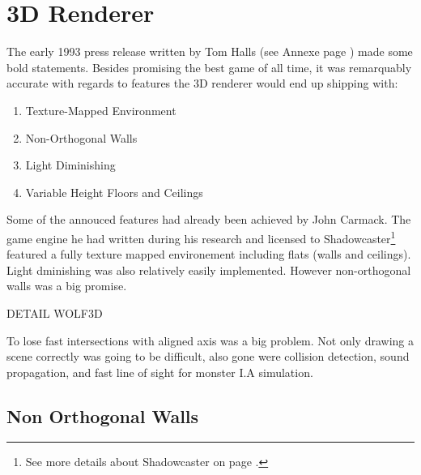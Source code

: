 \section{3D Renderer}
The early 1993 press release written by Tom Halls (see Annexe page \pageref{label_press_release}) made some bold statements. Besides promising the best game of all time, it was remarquably accurate with regards to features the 3D renderer would end up shipping with:\\
\par
\begin{enumerate}
\item Texture-Mapped Environment
\item Non-Orthogonal Walls
\item Light Diminishing
\item Variable Height Floors and Ceilings
\end{enumerate}
\par
Some of the annouced features had already been achieved by John Carmack. The game engine he had written during his research and licensed to Shadowcaster\footnote{See more details about Shadowcaster on page \pageref{label_shadowcaster}.} featured a fully texture mapped environement including flats (walls and ceilings). Light dminishing was also relatively easily implemented. However non-orthogonal walls was a big promise.\\
\par
DETAIL WOLF3D\\
\par
To lose fast intersections with aligned axis was a big problem. Not only drawing a scene correctly was going to be difficult, also gone were collision detection, sound propagation, and fast line of sight for monster I.A simulation.\\
\par
{}



\subsection{Non Orthogonal Walls}

